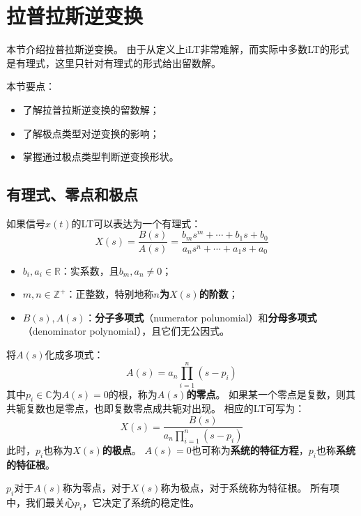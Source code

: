 \section{拉普拉斯逆变换}

本节介绍拉普拉斯逆变换。
由于从定义上iLT非常难解，而实际中多数LT的形式是有理式，这里只针对有理式的形式给出留数解。

本节要点：
\begin{itemize}
    \item 了解拉普拉斯逆变换的留数解；
    \item 了解极点类型对逆变换的影响；
    \item 掌握通过极点类型判断逆变换形状。
\end{itemize}

\subsection{有理式、零点和极点}

\begin{definition}
如果信号$x\left( t \right) $的LT可以表达为一个有理式：
\[
X\left( s \right) =\frac{B\left( s \right)}{A\left( s \right)}=\frac{b_ms^m+\cdots +b_1s+b_0}{a_ns^n+\cdots +a_1s+a_0}
\]
\begin{itemize}
    \item $b_i,a_i\in \mathbb{R} $：实系数，且$b_m,a_n\ne 0$；
    \item $m,n\in \mathbb{Z} ^+$：正整数，特别地称{\bf $n$为$X\left( s \right) $的阶数}；
    \item $B\left( s \right) ,A\left( s \right) $：{\bf 分子多项式}（numerator polunomial）和{\bf 分母多项式}（denominator polynomial），且它们无公因式。
\end{itemize}
将$A\left( s \right) $化成多项式：
\[
A\left( s \right) =a_n\prod_{i=1}^n{\left( s-p_i \right)}
\]
其中$p_i\in \mathbb{C} $为$A\left( s \right) =0$的根，称为{\bf $A\left( s \right) $的零点}。
如果某一个零点是复数，则其共轭复数也是零点，也即复数零点成共轭对出现。
相应的LT可写为：
\[
X\left( s \right) =\frac{B\left( s \right)}{a_n\prod_{i=1}^n{\left( s-p_i \right)}}
\]
此时，$p_i$也称为{\bf $X\left( s \right) $的极点}。
$A\left( s \right) =0$也可称为{\bf 系统的特征方程}，$p_i$也称{\bf 系统的特征根}。
\end{definition}

$p_i$对于$A\left( s \right) $称为零点，对于$X\left( s \right) $称为极点，对于系统称为特征根。
所有项中，我们最关心$p_i$，它决定了系统的稳定性。

